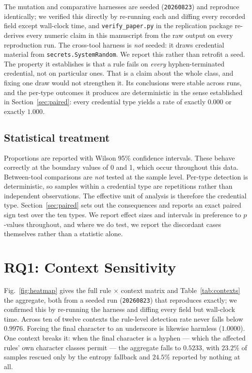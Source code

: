 \documentclass[journal]{IEEEtran}
\begin{document}
The mutation and comparative harnesses are seeded (\texttt{20260823}) and reproduce identically; we verified this directly by re-running each and diffing every recorded field except wall-clock time, and \texttt{verify\_paper.py} in the replication package re-derives every numeric claim in this manuscript from the raw output on every reproduction run. The cross-tool harness is \emph{not} seeded: it draws credential material from \texttt{secrets.SystemRandom}. We report this rather than retrofit a seed. The property it establishes is that a rule fails on \emph{every} hyphen-terminated credential, not on particular ones. That is a claim about the whole class, and fixing one draw would not strengthen it. Its conclusions were stable across runs, and the per-type outcomes it produces are deterministic in the sense established in Section~\ref{sec:paired}: every credential type yields a rate of exactly $0.000$ or exactly $1.000$.

\subsection{Statistical treatment}

Proportions are reported with Wilson 95\% confidence intervals. These behave correctly at the boundary values of 0 and 1, which occur throughout this data. Between-tool comparisons are \emph{not} tested at the sample level. Per-type detection is deterministic, so samples within a credential type are repetitions rather than independent observations. The effective unit of analysis is therefore the credential type. Section~\ref{sec:paired} sets out the consequences and reports an exact paired sign test over the ten types. We report effect sizes and intervals in preference to $p$-values throughout, and where we do test, we report the discordant cases themselves rather than a statistic alone.

\section{RQ1: Context Sensitivity}
\label{sec:rq1}

Fig.~\ref{fig:heatmap} gives the full rule $\times$ context matrix and Table~\ref{tab:contexts} the aggregate, both from a seeded run (\texttt{20260823}) that reproduces exactly; we confirmed this by re-running the harness and diffing every field but wall-clock time. Across ten of twelve contexts the rule-level detection rate never falls below $0.9976$. Forcing the final character to an underscore is likewise harmless ($1.0000$). One context breaks it: when the final character is a hyphen --- which the affected rules' own character classes permit --- the aggregate falls to $\mathbf{0.5233}$, with $23.2\%$ of samples rescued only by the entropy fallback and $\mathbf{24.5\%}$ reported by nothing at all.
\end{document}

